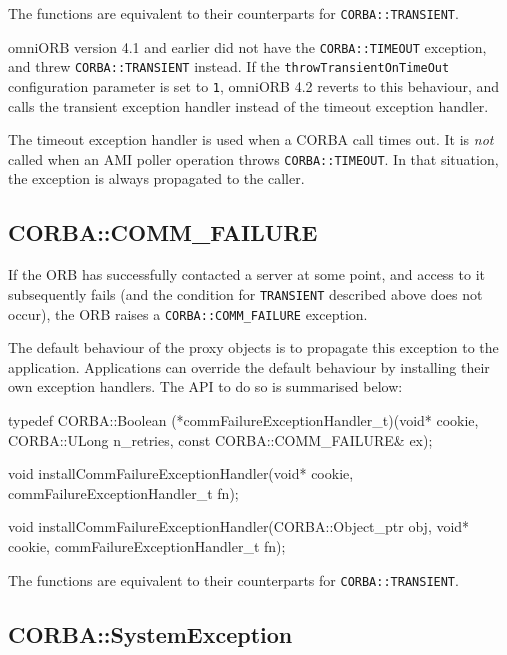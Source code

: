 \documentclass[11pt,oneside,a4paper]{book}
\newcommand{\code}[1]{\texttt{#1}}
\newcommand{\dsc}{\discretionary{}{}{}}
\begin{document}
The functions are equivalent to their counterparts for
\code{CORBA::TRANSIENT}.

omniORB version 4.1 and earlier did not have the \code{CORBA::TIMEOUT}
exception, and threw \code{CORBA::TRANSIENT} instead. If the
\code{throwTransientOnTimeOut} configuration parameter is set to
\code{1}, omniORB 4.2 reverts to this behaviour, and calls the
transient exception handler instead of the timeout exception handler.

The timeout exception handler is used when a CORBA call times out. It
is \emph{not} called when an AMI poller operation throws
\code{CORBA::TIMEOUT}. In that situation, the exception is always
propagated to the caller.



\subsection{CORBA::COMM\_FAILURE}

If the ORB has successfully contacted a server at some point, and
access to it subsequently fails (and the condition for
\code{TRANSIENT} described above does not occur), the ORB raises a
\code{CORBA::COMM\_\dsc{}FAILURE} exception.

The default behaviour of the proxy objects is to propagate this
exception to the application. Applications can override the default
behaviour by installing their own exception handlers. The API to do so
is summarised below:

\begin{cxxlisting}
typedef CORBA::Boolean
(*commFailureExceptionHandler_t)(void* cookie,
                                 CORBA::ULong n_retries,
                                 const CORBA::COMM_FAILURE& ex);

void
installCommFailureExceptionHandler(void* cookie,
                                   commFailureExceptionHandler_t fn);

void
installCommFailureExceptionHandler(CORBA::Object_ptr obj,
                                   void* cookie,
                                   commFailureExceptionHandler_t fn);
\end{cxxlisting}

The functions are equivalent to their counterparts for
\code{CORBA::TRANSIENT}.


\subsection{CORBA::SystemException}
\end{document}
